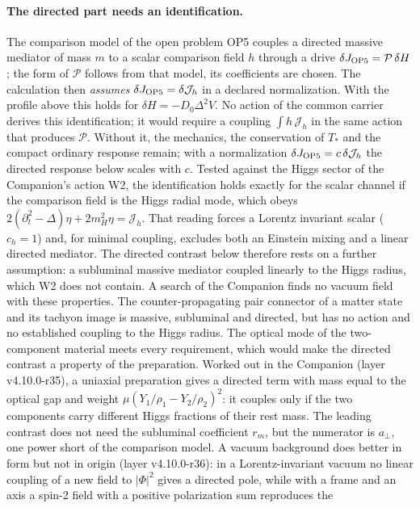 \paragraph{The directed part needs an identification.}
The comparison model of the open problem OP5 couples a directed massive
mediator of mass $m$ to a scalar comparison field $h$ through a drive
$\delta J_{\rm OP5}=\mathcal P\,\delta H$; the form of $\mathcal P$ follows from
that model, its coefficients are chosen. The calculation then
\emph{assumes} $\delta J_{\rm OP5}=\delta\mathcal J_h$ in a declared
normalization. With the profile above this holds for
$\delta H=-D_0\Delta^2V$. No action of the common carrier derives this
identification; it would require a coupling $\int h\,\mathcal J_h$ in
the same action that produces $\mathcal P$. Without it, the mechanics,
the conservation of $T_*$ and the compact ordinary response remain;
with a normalization $\delta J_{\rm OP5}=c\,\delta\mathcal J_h$ the directed
response below scales with $c$. Tested against the Higgs sector of the
Companion's action W2, the identification holds exactly for the scalar
channel if the comparison field is the Higgs radial mode, which obeys
$2(\partial_t^2-\Delta)\eta+2m_H^2\eta=\mathcal J_h$. That reading forces a Lorentz
invariant scalar ($c_h=1$) and, for minimal coupling, excludes both an
Einstein mixing and a linear directed mediator. The directed contrast
below therefore rests on a further assumption: a subluminal massive
mediator coupled linearly to the Higgs radius, which W2 does not
contain. A search of the Companion finds no vacuum field with these
properties. The counter-propagating pair connector of a matter state
and its tachyon image is massive, subluminal and directed, but has no
action and no established coupling to the Higgs radius. The optical
mode of the two-component material meets every requirement, which
would make the directed contrast a property of the preparation.
Worked out in the Companion (layer v4.10.0-r35), a uniaxial
preparation gives a directed term with mass equal to the optical gap
and weight \(\mu(Y_1/\rho_1-Y_2/\rho_2)^2\): it couples only if the two
components carry different Higgs fractions of their rest mass. The
leading contrast does not need the subluminal coefficient \(r_m\), but
the numerator is \(a_\perp\), one power short of the comparison model.
A vacuum background does better in form but not in origin (layer
v4.10.0-r36): in a Lorentz-invariant vacuum no linear coupling of a new
field to \(|\Phi|^2\) gives a directed pole, while with a frame and an
axis a spin-2 field with a positive polarization sum reproduces the
